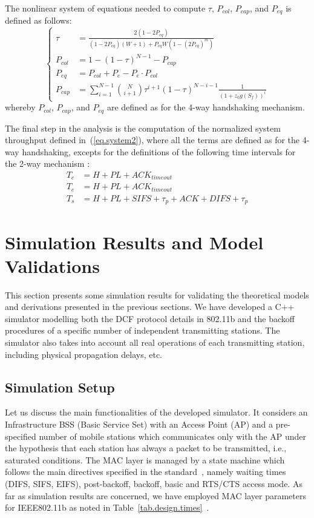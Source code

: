 \documentclass[10pt,onecolumn,a4paper]{IEEEtran}
\begin{document}
The nonlinear system of equations needed to compute $\tau$,
$P_{col}$, $P_{cap}$, and $P_{eq}$ is defined as follows:
\begin{equation}\label{eq.system2way}
\left\{ \begin{array}{ll} \tau &
=\frac{2(1-2P_{eq})}{(1-2P_{eq})(W+1)+P_{eq}W(1-(2P_{eq})^m)}\\
P_{col} &= 1-(1-\tau)^{N-1} -P_{cap}\\
P_{eq}   &=
P_{col}+P_e-P_e\cdot  P_{col}\\
P_{cap}&=\sum_{i=1}^{N-1}{N \choose
i+1}\tau^{i+1}(1-\tau)^{N-i-1}\frac{1}{{(1+z_{0}g(S_{f}))}^{i}}
\end{array} \right.
\end{equation}
whereby $P_{col}$, $P_{cap}$, and $P_{eq}$ are defined as for the
4-way handshaking mechanism.

The final step in the analysis is the computation of the
normalized system throughput defined in~(\ref{eq.system2}), where
all the terms are defined as for the 4-way handshaking, excepts
for the definitions of the following time intervals for the
2-way mechanism \cite{kong}:
\begin{equation}\label{tempi_coll_error_2}
 \begin{array}{ll}
T_c       &= H+PL+ACK_{timeout}              \\
T_e       &= H+PL+ACK_{timeout} \\
T_s       &= H+PL+SIFS+ \tau_p+ACK+DIFS +\tau_p
\end{array}
\end{equation}
\section{Simulation Results and Model Validations}
\label{Simulation_results_section}
This section presents some simulation results for validating the
theoretical models and derivations presented in the previous
sections. We have developed a C++ simulator modelling both the DCF
protocol details in 802.11b and the backoff procedures of a
specific number of independent transmitting stations. The
simulator also takes into account all real operations of each
transmitting station, including physical propagation delays, etc.
\subsection{Simulation Setup}
Let us discuss the main functionalities of the developed
simulator. It considers an Infrastructure BSS (Basic Service Set)
with an Access Point (AP) and a pre-specified number of mobile
stations which communicates only with the AP under the hypothesis
that each station has always a packet to be transmitted, i.e.,
saturated conditions. The MAC layer is managed
by a state machine which follows the main directives specified in
the standard~\cite{standard_DCF_MAC}, namely waiting times (DIFS,
SIFS, EIFS), post-backoff, backoff, basic and RTS/CTS access mode.
As far as simulation results are concerned, we have employed MAC
layer parameters for IEEE802.11b as noted in
Table~\ref{tab.design.times}~\cite{standard_DCF_MAC}.
\end{document}
